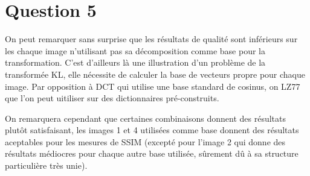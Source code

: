 \documentclass{article}[letterpaper, 11pt]
\begin{document}
\newpage
\section{Question 5}
On peut remarquer sans surprise que les résultats de qualité sont inférieurs sur les chaque image n'utilisant pas sa décomposition comme base pour la transformation. C'est d'ailleurs là une illustration d'un problème de la transformée KL, elle nécessite de calculer la base de vecteurs propre pour chaque image. Par opposition à DCT qui utilise une base standard de cosinus, on LZ77 que l'on peut uitiliser sur des dictionnaires pré-construits.

On remarquera cependant que certaines combinaisons donnent des résultats plutôt satisfaisant, les images 1 et 4 utilisées comme base donnent des résultats aceptables pour les mesures de SSIM (excepté pour l'image 2 qui donne des résultats médiocres pour chaque autre base utilisée, sûrement dû à sa structure particulière très unie).
\end{document}
